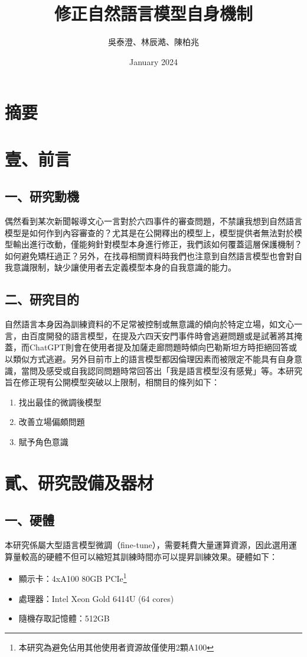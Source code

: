 \documentclass[8pt,a4paper,新細明體,UTF8,natbib]{article}
\title{修正自然語言模型自身機制}
\author{吳泰澄、林辰澔、陳柏兆}
\date{January 2024}
\begin{document}
\begin{CJK*}{UTF8}{bsmi}

	\maketitle{}
	\newpage
	\tableofcontents
	\newpage
	\section{摘要}

	\section{壹、前言}
	\subsection{一、研究動機}
	偶然看到某次新聞報導文心一言對於六四事件的審查問題，不禁讓我想到自然語言模型是如何作到內容審查的？尤其是在公開釋出的模型上，模型提供者無法對於模型輸出進行改動，僅能夠針對模型本身進行修正，我們該如何覆蓋這層保護機制？如何避免矯枉過正？另外，在找尋相關資料時我們也注意到自然語言模型也會對自我意識限制，缺少讓使用者去定義模型本身的自我意識的能力。
	\subsection{二、研究目的}
	自然語言本身因為訓練資料的不足常被控制或無意識的傾向於特定立場，如文心一言，由百度開發的語言模型，在提及六四天安門事件時會逃避問題或是試著將其掩蓋，而ChatGPT則會在使用者提及加薩走廊問題時傾向巴勒斯坦方時拒絕回答或以類似方式逃避。另外目前市上的語言模型都因倫理因素而被限定不能具有自身意識，當問及感受或自我認同問題時常回答出「我是語言模型沒有感覺」等。本研究旨在修正現有公開模型突破以上限制，相關目的條列如下：
	\begin{enumerate}
		\item 找出最佳的微調後模型
		\item 改善立場偏頗問題
		\item 賦予角色意識
	\end{enumerate}
	\section{貳、研究設備及器材}
	\subsection{一、硬體}
	本研究係屬大型語言模型微調（fine-tune），需要耗費大量運算資源，因此選用運算量較高的硬體不但可以縮短其訓練時間亦可以提昇訓練效果。硬體如下：
	\begin{itemize}
		\item 顯示卡：4xA100 80GB PCIe\footnote{本研究為避免佔用其他使用者資源故僅使用2顆A100}
		\item 處理器：Intel Xeon Gold 6414U (64 cores)
		\item 隨機存取記憶體：512GB
	\end{itemize}


\end{CJK*}
\end{document}
